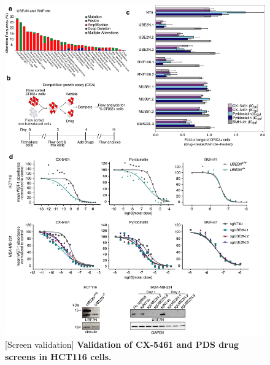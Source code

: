 \begin{figure}
    \centering
    \includegraphics[width=1\textwidth]{../figures/Figure2_genetic_validation}
    [Screen validation]
            {\small{\textbf{Validation of CX-5461 and PDS drug screens in HCT116 cells.}}
            }
        \label{fig:genetic-validation}
\end{figure}

